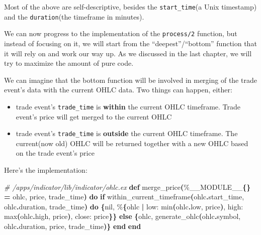 \documentclass[
  oneside]{book}
\newenvironment{Shaded}{\begin{snugshade}}{\end{snugshade}}
\newcommand{\CommentTok}[1]{\textcolor[rgb]{0.56,0.35,0.01}{\textit{#1}}}
\newcommand{\ConstantTok}[1]{\textcolor[rgb]{0.56,0.35,0.01}{#1}}
\newcommand{\ControlFlowTok}[1]{\textcolor[rgb]{0.13,0.29,0.53}{\textbf{#1}}}
\newcommand{\FunctionTok}[1]{\textcolor[rgb]{0.13,0.29,0.53}{\textbf{#1}}}
\newcommand{\KeywordTok}[1]{\textcolor[rgb]{0.13,0.29,0.53}{\textbf{#1}}}
\newcommand{\NormalTok}[1]{#1}
\newcommand{\OperatorTok}[1]{\textcolor[rgb]{0.81,0.36,0.00}{\textbf{#1}}}
\newcommand{\VariableTok}[1]{\textcolor[rgb]{0.00,0.00,0.00}{#1}}
\providecommand{\tightlist}{%
  \setlength{\itemsep}{0pt}\setlength{\parskip}{0pt}}
\begin{document}
Most of the above are self-descriptive, besides the \texttt{start\_time}(a Unix timestamp) and the \texttt{duration}(the timeframe in minutes).

We can now progress to the implementation of the \texttt{process/2} function, but instead of focusing on it, we will start from the ``deepest''/``bottom'' function that it will rely on and work our way up. As we discussed in the last chapter, we will try to maximize the amount of pure code.

We can imagine that the bottom function will be involved in merging of the trade event's data with the current OHLC data. Two things can happen, either:

\begin{itemize}
\tightlist
\item
  trade event's \texttt{trade\_time} is \textbf{within} the current OHLC timeframe. Trade event's price will get merged to the current OHLC
\item
  trade event's \texttt{trade\_time} is \textbf{outside} the current OHLC timeframe. The current(now old) OHLC will be returned together with a new OHLC based on the trade event's price
\end{itemize}

\newpage

Here's the implementation:

\begin{Shaded}
\begin{Highlighting}[]
\CommentTok{\# /apps/indicator/lib/indicator/ohlc.ex}
  \KeywordTok{def}\NormalTok{ merge\_price}\FunctionTok{(}\NormalTok{\%}\ConstantTok{\_\_MODULE\_\_}\FunctionTok{\{\}} \OperatorTok{=}\NormalTok{ ohlc, price, trade\_time}\FunctionTok{)} \KeywordTok{do}
    \ControlFlowTok{if}\NormalTok{ within\_current\_timeframe}\FunctionTok{(}\NormalTok{ohlc}\OperatorTok{.}\NormalTok{start\_time, ohlc}\OperatorTok{.}\NormalTok{duration, trade\_time}\FunctionTok{)} \KeywordTok{do}
      \FunctionTok{\{}\ConstantTok{nil}\NormalTok{, \%}\FunctionTok{\{}\NormalTok{ohlc }\OperatorTok{|} \VariableTok{low:}\NormalTok{ min}\FunctionTok{(}\NormalTok{ohlc}\OperatorTok{.}\NormalTok{low, price}\FunctionTok{)}\NormalTok{, }\VariableTok{high:}\NormalTok{ max}\FunctionTok{(}\NormalTok{ohlc}\OperatorTok{.}\NormalTok{high, price}\FunctionTok{)}\NormalTok{, }\VariableTok{close:}\NormalTok{ price}\FunctionTok{\}\}}
    \ControlFlowTok{else}
      \FunctionTok{\{}\NormalTok{ohlc, generate\_ohlc}\FunctionTok{(}\NormalTok{ohlc}\OperatorTok{.}\NormalTok{symbol, ohlc}\OperatorTok{.}\NormalTok{duration, price, trade\_time}\FunctionTok{)\}}
    \KeywordTok{end}
  \KeywordTok{end}
\end{Highlighting}
\end{Shaded}
\end{document}
